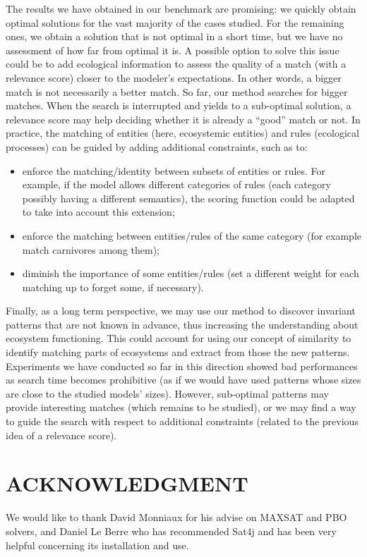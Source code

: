 \documentclass[a4paper,twoside]{article}
\begin{document}
The results we have obtained in our benchmark are promising: we quickly obtain optimal solutions for the vast majority of the cases studied. 
For the remaining ones, we obtain a solution that is not optimal in a short time, but we have no assessment of how far from optimal it is.
A possible option to solve this issue could be to add ecological information to assess the quality of a match (with a relevance score) closer to the modeler's expectations.  
In other words, a bigger match is not necessarily a better match. So far, our method searches for bigger matches. When the search is interrupted and yields to a sub-optimal solution, a relevance score may help deciding whether it is already a ``good'' match or not.   
In practice, the matching of entities (here, ecosystemic entities) and rules (ecological processes) can be guided by adding additional constraints, such as to:  
\begin{itemize}
 \item enforce the matching/identity between subsets of entities or rules. For example, if the model allows different categories of rules (each category possibly having a different semantics), the scoring function could be adapted to take into account this extension;  
 \item enforce the matching between entities/rules of the same category (for example match carnivores among them);
 \item diminish the importance of some entities/rules (\ie set a different weight for each matching up to forget some, if necessary).
 \end{itemize}

Finally, as a long term perspective, we may use our method to discover invariant patterns that are not known in advance, thus increasing the  understanding about ecosystem functioning. This could account for using our concept of similarity to identify matching parts of ecosystems and extract from those the new patterns. Experiments we have conducted so far in this direction showed bad performances as search time becomes prohibitive (as if we would have used patterns whose sizes are close to the studied models' sizes).  
However, sub-optimal patterns may provide interesting matches (which remains to be studied), or we may find a way to guide the search with respect to additional constraints (related to the previous idea of a relevance score). 





\section*{\uppercase{Acknowledgment}}
We would like to thank David Monniaux for his advise on MAXSAT and
PBO solvers, and Daniel Le Berre who has recommended Sat4j and has
been very helpful concerning its installation and use.



{\small

}
%
\end{document}
